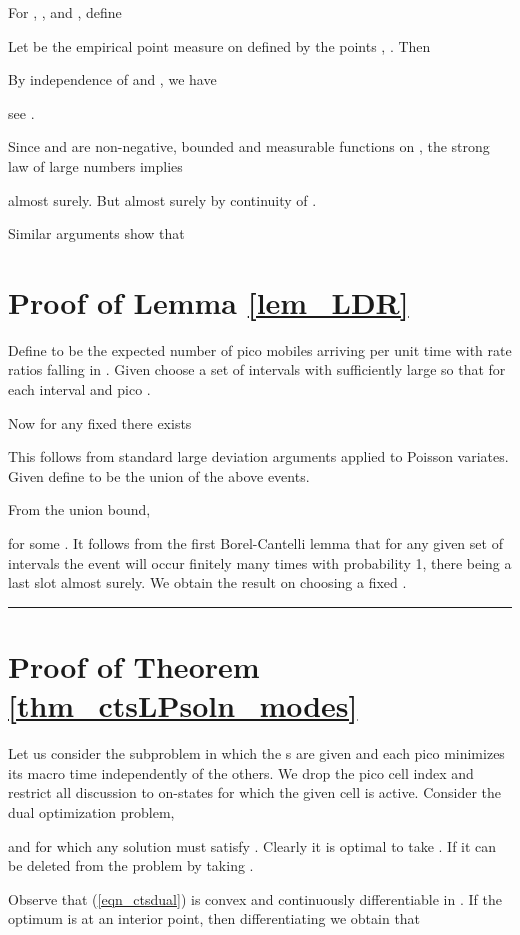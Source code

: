 \documentclass[12pt, draftcls, onecolumn]{IEEEtranTCOM}
\newcommand\qed{\hfill \rule{1.2mm}{2.8mm}}
\begin{document}
{For , , and , define


Let  be the empirical point measure on  defined by the points , . Then

By independence of  and , we have

see \cite{Billingsley68}.

Since  and  are non-negative, bounded and measurable functions on , the strong law of large numbers implies

almost surely. But  almost surely by continuity of .

Similar arguments show that



\section{Proof of Lemma \ref{lem_LDR}}
\label{app_lemLDR}
Define 
to be the expected number of pico  mobiles arriving per unit time with rate ratios falling
in .
Given  choose a set of intervals  with  sufficiently
large so that  for each interval  and pico .

Now for  any fixed  there exists 

This  follows from standard large deviation arguments applied
to Poisson variates. Given  define  to be the union of the above events.

From the union bound,

for some .  It follows from the first Borel-Cantelli lemma
that for any given set of intervals the event  will occur
finitely many times with probability 1, there being a last slot
 almost surely. We obtain the result on choosing a fixed . \qed



\section{Proof of Theorem \ref{thm_ctsLPsoln_modes}}
\label{app_ctsLPsoln_modes}
Let us consider the subproblem in which the s are given and each pico  minimizes its macro time independently of the others. We drop the pico cell index and restrict all discussion to on-states for which the given cell is active. Consider the dual optimization problem,

and for which any solution must satisfy .
Clearly it is optimal to take . If 
it can be deleted from the problem by taking .

Observe that  (\ref{eqn_ctsdual}) is convex and continuously differentiable in . If the optimum is at an interior point, then differentiating we obtain that

}
\end{document}
